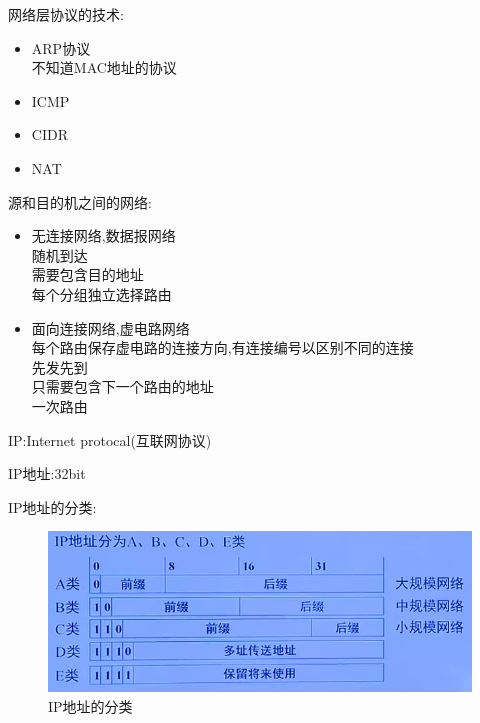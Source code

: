 \documentclass[UTF8,a4paper]{ctexart}
\begin{document}
网络层协议的技术:
\begin{itemize}
  \item ARP协议\\
  不知道MAC地址的协议
  \item ICMP
  \item CIDR
  \item NAT
\end{itemize}

源和目的机之间的网络:
\begin{itemize}
  \item 无连接网络,数据报网络\\
  随机到达\\
  需要包含目的地址\\
  每个分组独立选择路由
  \item 面向连接网络,虚电路网络\\
  每个路由保存虚电路的连接方向,有连接编号以区别不同的连接\\
  先发先到\\
  只需要包含下一个路由的地址\\
  一次路由
\end{itemize}

IP:Internet protocal(互联网协议)

IP地址:32bit

IP地址的分类:
\begin{figure}[H]
  \centering
  \includegraphics{assets/jisuanjiwangluo_05eb3.png}
  \caption{IP地址的分类}
\end{figure}
\end{document}
